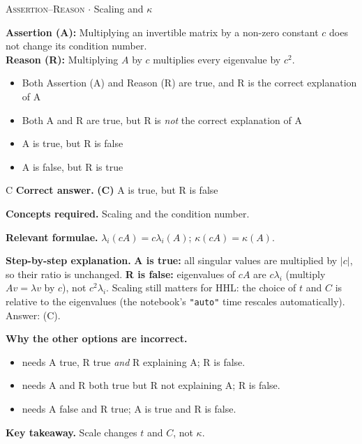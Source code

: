 \documentclass[11pt,a4paper]{article}
\newcommand{\optlabel}[1]{\textbf{(#1)}}
\newcommand{\correctlabel}[1]{\textcolor{okgreen}{\textbf{(#1)}\,\ding{51}}}
\newenvironment{qitem}[1]{\begin{list}{}{\setlength{\leftmargin}{3.3em}\setlength{\labelwidth}{3.1em}%
  \setlength{\labelsep}{0.2em}\setlength{\topsep}{3pt}\setlength{\parsep}{3pt}}\item[\textbf{Q.#1}\hfill]}{\end{list}}
\newcommand{\qsep}{\par\vspace{2pt}{\color{black!15}\hrule}\vspace{4pt}}
\newcommand{\qmeta}[2]{{\footnotesize\color{black!60}\textsc{#1} \;$\cdot$\; #2}\par}
\begin{document}
\begin{qitem}{20}
\qmeta{Assertion--Reason}{Scaling and $\kappa$}
\textbf{Assertion (A):} Multiplying an invertible matrix by a non-zero constant $c$ does not change its condition number.\\[1mm]
\textbf{Reason (R):} Multiplying $A$ by $c$ multiplies every eigenvalue by $c^2$.
\begin{itemize}[leftmargin=2.6em, labelsep=0.4em, itemsep=2pt, topsep=3pt]
\item[\optlabel{A}] Both Assertion (A) and Reason (R) are true, and R is the correct explanation of A
\item[\optlabel{B}] Both A and R are true, but R is \emph{not} the correct explanation of A
\item[\correctlabel{C}] A is true, but R is false
\item[\optlabel{D}] A is false, but R is true
\end{itemize}
\end{qitem}
\begin{solbox}{C}
\textbf{\color{brand}Correct answer.} \textcolor{okgreen}{\textbf{(C)}} A is true, but R is false

\textbf{\color{brand}Concepts required.} Scaling and the condition number.

\textbf{\color{brand}Relevant formulae.} $\lambda_i(cA) = c\lambda_i(A)$; $\kappa(cA) = \kappa(A)$.

\textbf{\color{brand}Step-by-step explanation.} \textbf{A is true:} all singular values are multiplied by $|c|$, so their ratio is unchanged.
\textbf{R is false:} eigenvalues of $cA$ are $c\lambda_i$ (multiply $Av = \lambda v$ by $c$), not $c^2\lambda_i$. Scaling still matters for HHL: the choice of $t$ and $C$ is
relative to the eigenvalues (the notebook's \texttt{"auto"} time rescales automatically). Answer: (C).

\textbf{\color{brand}Why the other options are incorrect.}
\begin{itemize}[leftmargin=2.4em, itemsep=1pt, topsep=2pt]
\item[\textbf{(A)}] needs A true, R true \emph{and} R explaining A; R is false.
\item[\textbf{(B)}] needs A and R both true but R not explaining A; R is false.
\item[\textbf{(D)}] needs A false and R true; A is true and R is false.
\end{itemize}
\textbf{\color{brand}Key takeaway.} Scale changes $t$ and $C$, not $\kappa$.
\end{solbox}
\qsep
\end{document}
